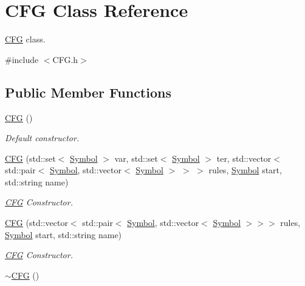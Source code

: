 \hypertarget{class_c_f_g}{\section{\-C\-F\-G \-Class \-Reference}
\label{class_c_f_g}
}


\hyperlink{class_c_f_g}{\-C\-F\-G} class.  




{\ttfamily \#include $<$\-C\-F\-G.\-h$>$}

\subsection*{\-Public \-Member \-Functions}
\begin{DoxyCompactItemize}
\item 
\hypertarget{class_c_f_g_a6a6d74b60d6abc9b91031aaac23067ff}{\hyperlink{class_c_f_g_a6a6d74b60d6abc9b91031aaac23067ff}{\-C\-F\-G} ()}\label{class_c_f_g_a6a6d74b60d6abc9b91031aaac23067ff}

\begin{DoxyCompactList}\small\item\em \-Default constructor. \end{DoxyCompactList}\item 
\hyperlink{class_c_f_g_a2f6e0eccd983f665975fd2cc9a891d6d}{\-C\-F\-G} (std\-::set$<$ \hyperlink{class_symbol}{\-Symbol} $>$ var, std\-::set$<$ \hyperlink{class_symbol}{\-Symbol} $>$ ter, std\-::vector$<$ std\-::pair$<$ \hyperlink{class_symbol}{\-Symbol}, std\-::vector$<$ \hyperlink{class_symbol}{\-Symbol} $>$ $>$ $>$ rules, \hyperlink{class_symbol}{\-Symbol} start, std\-::string name)
\begin{DoxyCompactList}\small\item\em \hyperlink{class_c_f_g}{\-C\-F\-G} \-Constructor. \end{DoxyCompactList}\item 
\hyperlink{class_c_f_g_a033e92acc40b5c7a78614fbff47211cb}{\-C\-F\-G} (std\-::vector$<$ std\-::pair$<$ \hyperlink{class_symbol}{\-Symbol}, std\-::vector$<$ \hyperlink{class_symbol}{\-Symbol} $>$$>$$>$ rules, \hyperlink{class_symbol}{\-Symbol} start, std\-::string name)
\begin{DoxyCompactList}\small\item\em \hyperlink{class_c_f_g}{\-C\-F\-G} \-Constructor. \end{DoxyCompactList}\item 
\hypertarget{class_c_f_g_a7a9e0feb406099038faea4c67ef31786}{\hyperlink{class_c_f_g_a7a9e0feb406099038faea4c67ef31786}{$\sim$\-C\-F\-G} ()}\label{class_c_f_g_a7a9e0feb406099038faea4c67ef31786}


\end{DoxyCompactItemize}
